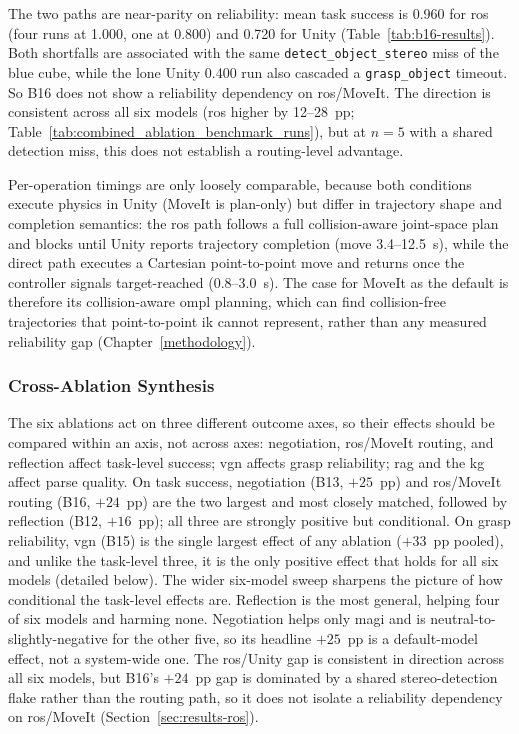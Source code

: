 \documentclass[
     12pt,
     a4paper,
     BCOR=10mm,
     DIV=14,
     listof=totoc,
     bibliography=totoc,
     parskip,
     twoside,
     headsepline
     ]{scrreprt}
\begin{document}
The two paths are near-parity on reliability: mean task success is 0.960 for \gls{ros} (four runs at 1.000, one at 0.800) and 0.720 for Unity (Table~\ref{tab:b16-results}). Both shortfalls are associated with the same \texttt{detect\_object\_stereo} miss of the blue cube, while the lone Unity 0.400 run also cascaded a \texttt{grasp\_object} timeout. So B16 does not show a reliability dependency on \gls{ros}/MoveIt. The direction is consistent across all six models (\gls{ros} higher by 12--28~pp; Table~\ref{tab:combined_ablation_benchmark_runs}), but at $n = 5$ with a shared detection miss, this does not establish a routing-level advantage.

Per-operation timings are only loosely comparable, because both conditions execute physics in Unity (MoveIt is plan-only) but differ in trajectory shape and completion semantics: the \gls{ros} path follows a full collision-aware joint-space plan and blocks until Unity reports trajectory completion (move 3.4--12.5~s), while the direct path executes a Cartesian point-to-point move and returns once the controller signals target-reached (0.8--3.0~s). The case for MoveIt as the default is therefore its collision-aware \gls{ompl} planning, which can find collision-free trajectories that point-to-point \gls{ik} cannot represent, rather than any measured reliability gap (Chapter~\ref{methodology}).

\subsubsection{Cross-Ablation Synthesis}\label{sec:results-ablation-synthesis}
The six ablations act on three different outcome axes, so their effects should be compared within an axis, not across axes: negotiation, \gls{ros}/MoveIt routing, and reflection affect task-level success; \gls{vgn} affects grasp reliability; \gls{rag} and the \gls{kg} affect parse quality. On task success, negotiation (B13, $+25$~pp) and \gls{ros}/MoveIt routing (B16, $+24$~pp) are the two largest and most closely matched, followed by reflection (B12, $+16$~pp); all three are strongly positive but conditional. On grasp reliability, \gls{vgn} (B15) is the single largest effect of any ablation ($+33$~pp pooled), and unlike the task-level three, it is the only positive effect that holds for all six models (detailed below). The wider six-model sweep sharpens the picture of how conditional the task-level effects are. Reflection is the most general, helping four of six models and harming none. Negotiation helps only \gls{magi} and is neutral-to-slightly-negative for the other five, so its headline $+25$~pp is a default-model effect, not a system-wide one. The \gls{ros}/Unity gap is consistent in direction across all six models, but B16's $+24$~pp gap is dominated by a shared stereo-detection flake rather than the routing path, so it does not isolate a reliability dependency on \gls{ros}/MoveIt (Section~\ref {sec:results-ros}).
\end{document}
